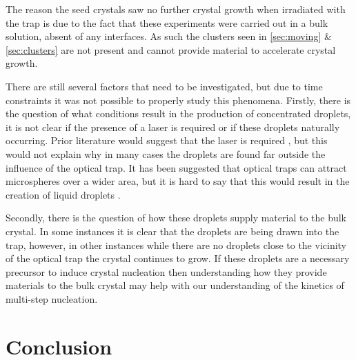 The reason the seed crystals saw no further crystal growth when irradiated 
with the trap is due to the fact that these experiments were carried out 
in a bulk solution, absent of any interfaces. As such the clusters seen in
\ref{sec:moving} \& \ref{sec:clusters} are not present and cannot provide
material to accelerate crystal growth.

There are still several factors that need to be investigated, but due to time
constraints it was not possible to properly study this phenomena. Firstly, 
there is the question of what conditions result in the production of concentrated
droplets, it is not clear if the presence of a laser is required or if these
droplets naturally occurring. Prior literature would suggest that the laser is 
required \cite{Liao2022, Tsuboi2009}, but this would not explain why in many 
cases the droplets are found far outside the influence of the optical trap. It
has been suggested that optical traps can attract microspheres over a wider 
area, but it is hard to say that this would result in the creation of liquid 
droplets \cite{Yi2021}.

Secondly, there is the question of how these droplets supply material to the 
bulk crystal. In some instances it is clear that the droplets are being drawn 
into the trap, however, in other instances while there are no droplets close to
the vicinity of the optical trap the crystal continues to grow. If these droplets
are a necessary precursor to induce crystal nucleation then understanding how
they provide materials to the bulk crystal may help with our understanding of 
the kinetics of multi-step nucleation. 

\section{Conclusion}


